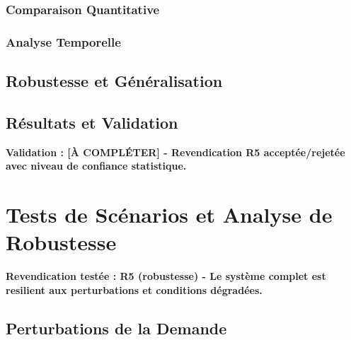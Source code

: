 \subsubsection{Comparaison Quantitative}

\subsubsection{Analyse Temporelle}

\subsection{Robustesse et Généralisation}
\label{subsec:robustesse_generalisation}

\subsection{Résultats et Validation}
\label{subsec:resultats_entrainement}

\textbf{Validation : [À COMPLÉTER] - Revendication R5 acceptée/rejetée avec niveau de confiance statistique.}

\section{Tests de Scénarios et Analyse de Robustesse}
\label{sec:tests_scenarios}

\textbf{Revendication testée : R5 (robustesse) - Le système complet est resilient aux perturbations et conditions dégradées.}

\subsection{Perturbations de la Demande}
\label{subsec:perturbations_demande}

